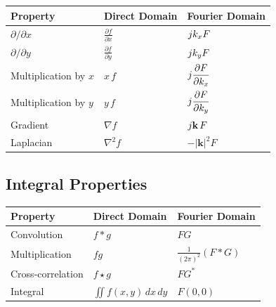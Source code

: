 \begin{center}
\begin{tabular}{lll}
\toprule
Property & Direct Domain & Fourier Domain\\
\midrule

$\partial/\partial x$
&
$\displaystyle\frac{\partial f}{\partial x}$
&
$jk_x F$

\\[0.4cm]

$\partial/\partial y$
&
$\displaystyle\frac{\partial f}{\partial y}$
&
$jk_y F$

\\[0.4cm]

Multiplication by $x$
&
$x\,f$
&
$\displaystyle
j\frac{\partial F}{\partial k_x}
$

\\[0.5cm]

Multiplication by $y$
&
$y\,f$
&
$\displaystyle
j\frac{\partial F}{\partial k_y}
$

\\[0.5cm]

Gradient
&
$\nabla f$
&
$j\mathbf{k}\,F$

\\[0.4cm]

Laplacian
&
$\nabla^2f$
&
$-|\mathbf{k}|^2F$

\\

\bottomrule
\end{tabular}
\end{center}

\subsection{Integral Properties}

\begin{center}
\begin{tabular}{lll}
\toprule
Property & Direct Domain & Fourier Domain\\
\midrule

Convolution &
$f*g$
&
$FG$

\\[0.3cm]

Multiplication &
$fg$
&
$\displaystyle\frac{1}{(2\pi)^2}(F*G)$

\\[0.4cm]

Cross-correlation &
$f\star g$
&
$FG^{*}$

\\[0.3cm]


Integral &
$\displaystyle\iint f(x,y)\,dx\,dy$
&
$F(0,0)$

\\

\bottomrule
\end{tabular}
\end{center}

